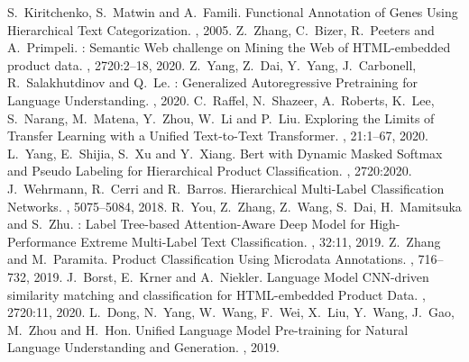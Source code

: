 \documentclass[11pt,dvipdfm]{article}
\begin{document}
\begin{thebibliography}{10}
\begin{small}
S.~Kiritchenko, S.~Matwin and A.~Famili. \newblock Functional {Annotation} of {Genes} {Using} {Hierarchical} {Text} {Categorization}. , 2005.
Z.~Zhang, C.~Bizer, R.~Peeters and A.~Primpeli. : {Semantic} {Web} challenge on {Mining} the {Web} of {HTML}-embedded product data. , 2720:2--18, 2020.
Z.~Yang, Z.~Dai, Y.~Yang, J.~Carbonell, R.~Salakhutdinov and Q.~Le. : {Generalized} {Autoregressive} {Pretraining} for {Language} {Understanding}. , 2020.
C.~Raffel, N.~Shazeer, A.~Roberts, K.~Lee, S.~Narang, M.~Matena, Y.~Zhou, W.~Li and P.~Liu. \newblock Exploring the {Limits} of {Transfer} {Learning} with a {Unified} {Text}-to-{Text} {Transformer}. , 21:1--67, 2020.
L.~Yang, E.~Shijia, S.~Xu and Y.~Xiang. \newblock Bert with {Dynamic} {Masked} {Softmax} and {Pseudo} {Labeling} for {Hierarchical} {Product} {Classification}. , 2720:2020.
J.~Wehrmann, R.~Cerri and R.~Barros. \newblock Hierarchical {Multi}-{Label} {Classification} {Networks}. , 5075--5084, 2018.
R.~You, Z.~Zhang, Z.~Wang, S.~Dai, H.~Mamitsuka and S.~Zhu. : {Label} {Tree}-based {Attention}-{Aware} {Deep} {Model} for {High}-{Performance} {Extreme} {Multi}-{Label} {Text} {Classification}. , 32:11, 2019.
Z.~Zhang and M.~Paramita. \newblock Product {Classification} {Using} {Microdata} {Annotations}. , 716--732, 2019.
J.~Borst, E.~Krner and A.~Niekler. \newblock Language {Model} {CNN}-driven similarity matching and classification for {HTML}-embedded {Product} {Data}. , 2720:11, 2020.
L.~Dong, N.~Yang, W.~Wang, F.~Wei, X.~Liu, Y.~Wang, J.~Gao, M.~Zhou and H.~Hon. \newblock Unified {Language} {Model} {Pre}-training for {Natural} {Language} {Understanding} and {Generation}. , 2019.

\end{small}
\end{thebibliography}
\end{document}
